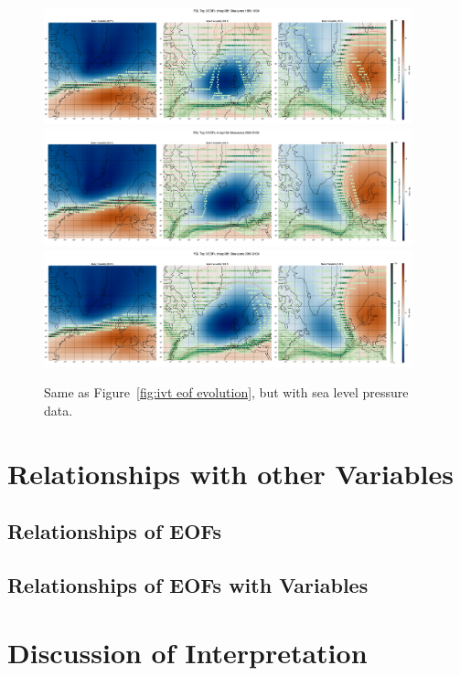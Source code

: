 \begin{figure}
  \begin{center}
    \includegraphics[width=0.95\textwidth]{figures/psl_spat_patterns_hexbin_18501899_ssp585_50seasons.png}
    \includegraphics[width=0.95\textwidth]{figures/psl_spat_patterns_hexbin_20502100_ssp126_50seasons.png}
    \includegraphics[width=0.95\textwidth]{figures/psl_spat_patterns_hexbin_20502100_ssp585_50seasons.png}
  \end{center}
  \caption{Same as Figure~\ref{fig:ivt eof evolution}, but with sea level pressure data.}\label{fig:psl eof evolution}
\end{figure}

\section{Relationships with other Variables}

\subsection{Relationships of EOFs}


\subsection{Relationships of EOFs with Variables}


\section{Discussion of Interpretation}
\label{sec:discussion}
